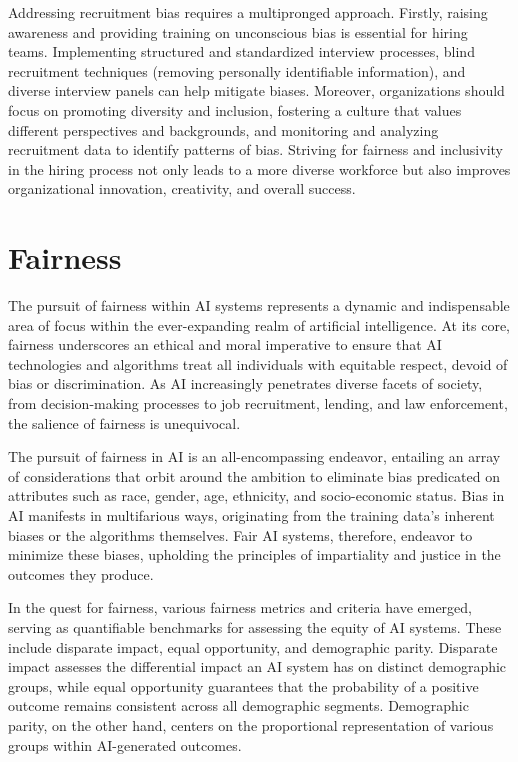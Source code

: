 \documentclass[12pt,a4paper,openright,twoside]{book}
\begin{document}
Addressing recruitment bias requires a multipronged approach. Firstly, raising awareness and providing training on unconscious bias is essential for hiring teams. Implementing structured and standardized interview processes, blind recruitment techniques (removing personally identifiable information), and diverse interview panels can help mitigate biases. Moreover, organizations should focus on promoting diversity and inclusion, fostering a culture that values different perspectives and backgrounds, and monitoring and analyzing recruitment data to identify patterns of bias. Striving for fairness and inclusivity in the hiring process not only leads to a more diverse workforce but also improves organizational innovation, creativity, and overall success.

\newpage
\section{Fairness} 

The pursuit of fairness within AI systems represents a dynamic and indispensable area of focus within the ever-expanding realm of artificial intelligence. At its core, fairness underscores an ethical and moral imperative to ensure that AI technologies and algorithms treat all individuals with equitable respect, devoid of bias or discrimination. As AI increasingly penetrates diverse facets of society, from decision-making processes to job recruitment, lending, and law enforcement, the salience of fairness is unequivocal. 

The pursuit of fairness in AI is an all-encompassing endeavor, entailing an array of considerations that orbit around the ambition to eliminate bias predicated on attributes such as race, gender, age, ethnicity, and socio-economic status. Bias in AI manifests in multifarious ways, originating from the training data's inherent biases or the algorithms themselves. Fair AI systems, therefore, endeavor to minimize these biases, upholding the principles of impartiality and justice in the outcomes they produce. 

In the quest for fairness, various fairness metrics and criteria have emerged, serving as quantifiable benchmarks for assessing the equity of AI systems. These include disparate impact, equal opportunity, and demographic parity. Disparate impact assesses the differential impact an AI system has on distinct demographic groups, while equal opportunity guarantees that the probability of a positive outcome remains consistent across all demographic segments. Demographic parity, on the other hand, centers on the proportional representation of various groups within AI-generated outcomes. 
\end{document}
